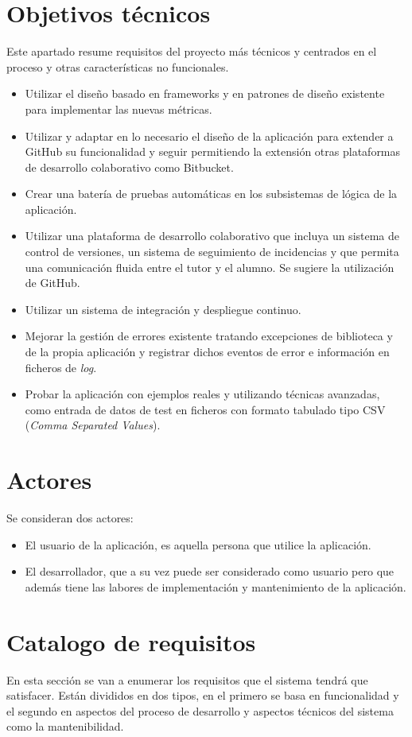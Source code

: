 \section{Objetivos técnicos}
Este apartado resume requisitos del proyecto más técnicos y centrados en el proceso y otras características no funcionales.
\begin{itemize}
	\tightlist
	\item Utilizar el diseño basado en frameworks y en patrones de diseño \cite{gamma_patrones_2002} existente para implementar las nuevas métricas.
	\item Utilizar y adaptar en lo necesario el diseño de la aplicación para extender a GitHub su funcionalidad y seguir permitiendo la extensión otras plataformas de desarrollo colaborativo como Bitbucket.
	\item Crear una batería de pruebas automáticas en los subsistemas de lógica de la aplicación.
	\item Utilizar una plataforma de desarrollo colaborativo que incluya un sistema de control de versiones, un sistema de seguimiento de incidencias y que permita una comunicación fluida entre el tutor y el alumno. Se sugiere la utilización de GitHub.
	\item Utilizar un sistema de integración y despliegue continuo.
	\item Mejorar la gestión de errores existente tratando excepciones de biblioteca y de la propia aplicación y registrar dichos eventos de error e información en ficheros de \textit{log}. 
	\item Probar la aplicación con ejemplos reales y utilizando técnicas avanzadas, como entrada de datos de test en ficheros con formato tabulado tipo CSV (\textit{Comma Separated Values}). 	
\end{itemize}

\section{Actores}
Se consideran dos actores:
\begin{itemize}
	\tightlist
	\item El usuario de la aplicación, es aquella persona que utilice la aplicación.
	\item El desarrollador, que a su vez puede ser considerado como usuario pero que además tiene las labores de implementación y mantenimiento de la aplicación.
\end{itemize}

\section{Catalogo de requisitos}
En esta sección se van a enumerar los requisitos que el sistema tendrá que satisfacer. Están divididos en dos tipos, en el primero se basa en funcionalidad y el segundo en aspectos del proceso de desarrollo y aspectos técnicos del sistema como la mantenibilidad.

